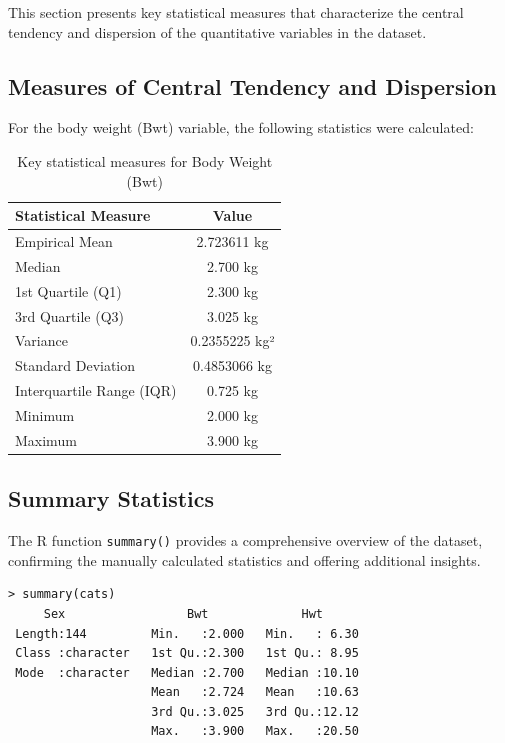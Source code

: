 \documentclass[a4paper,12pt]{article}
\begin{document}
This section presents key statistical measures that characterize the central tendency and dispersion of the quantitative variables in the dataset.

\subsection{Measures of Central Tendency and Dispersion}
\label{subsec:measures}

For the body weight (Bwt) variable, the following statistics were calculated:

\begin{table}[H]
    \centering
    \caption{Key statistical measures for Body Weight (Bwt)}
    \label{tab:bwt_stats}
    \begin{tabular}{@{}lc@{}}
        \toprule
        \textbf{Statistical Measure} & \textbf{Value} \\
        \midrule
        Empirical Mean & 2.723611 kg \\
        Median & 2.700 kg \\
        1st Quartile (Q1) & 2.300 kg \\
        3rd Quartile (Q3) & 3.025 kg \\
        Variance & 0.2355225 kg² \\
        Standard Deviation & 0.4853066 kg \\
        Interquartile Range (IQR) & 0.725 kg \\
        Minimum & 2.000 kg \\
        Maximum & 3.900 kg \\
        \bottomrule
    \end{tabular}
\end{table}

\subsection{Summary Statistics}
\label{subsec:summary}

The R function \texttt{summary()} provides a comprehensive overview of the dataset, confirming the manually calculated statistics and offering additional insights.

\begin{lstlisting}[caption={Summary statistics for the cats dataset}, label={lst:summary}]
> summary(cats)
     Sex                 Bwt             Hwt       
 Length:144         Min.   :2.000   Min.   : 6.30
 Class :character   1st Qu.:2.300   1st Qu.: 8.95
 Mode  :character   Median :2.700   Median :10.10
                    Mean   :2.724   Mean   :10.63  
                    3rd Qu.:3.025   3rd Qu.:12.12
                    Max.   :3.900   Max.   :20.50
\end{lstlisting}
\end{document}
